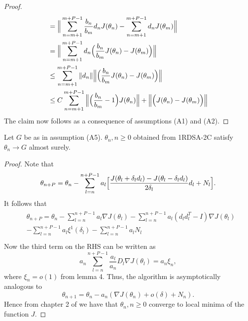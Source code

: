 \begin{proof}
\begin{align*}
  & =\Big{\|}\sum_{n=m+1}^{m+P-1}\frac{b_n}{b_m}d_n J(\theta_n)-\sum_{n=m+1}^{m+P-1}d_n J(\theta_{m})\Big{\|}\\
  & =\Big{\|}\sum_{n=m+1}^{m+P-1}d_n\Big{(}\frac{b_n}{b_m}J(\theta_n)-J(\theta_{m})\Big{)}\Big{\|}\\
  & \leq \sum_{n=m+1}^{m+P-1}\|d_n\|\Big{\|}\Big{(}\frac{b_n}{b_m}J(\theta_n)-J(\theta_{m})\Big{)}\Big{\|}\\
  &\leq C \sum_{n=m+1}^{m+P-1}\Big{\|}\Big{(}\frac{b_n}{b_m}-1\Big{)} J(\theta_n)\Big{\|}
  +\Big{\|}\Big{(} J(\theta_n)- J(\theta_{m})\Big{)}\Big{\|}
\end{align*}
The claim now follows as a consequence of assumptions (A1) and (A2).
\end{proof}
\begin{theorem}
 Let $G$ be as in assumption (A5). $\theta_n, n\geq0$ obtained from 1RDSA-2C satisfy $\theta_n \rightarrow G$
 almost surely.
\end{theorem}
\begin{proof}
 Note that
 \begin{equation*}
  \theta_{n+P} = \theta_n-\sum\limits_{l=n}^{n+P-1}a_l\Big{[}\frac{J(\theta_l+\delta_l d_l)-J(\theta_l-\delta_l d_l)}{2\delta_l}d_l+N_{l}\Big{]}.
 \end{equation*}
It follows that
 \begin{align*}
  \begin{split}
  & \theta_{n+P} = \theta_n-\sum_{l=n}^{n+P-1}a_l\nabla J(\theta_l) 
   -\sum_{l=n}^{n+P-1}a_l(d_ld_l^T-I)\nabla J(\theta_l)\\
  & -\sum_{l=n}^{n+P-1}a_l \xi^{1}(\delta_l)-\sum_{l=n}^{n+P-1}a_lN_{l}\\
  \end{split}
 \end{align*}
Now the third term on the RHS can be written as
$$a_n\sum_{l=n}^{n+P-1}\frac{a_l}{a_n}D_{l}\nabla J(\theta_l)=a_n\xi_{n},$$
where $\xi_{n}=o(1)$ from lemma 4.
Thus, the algorithm is asymptotically analogous to
$$\theta_{n+1}=\theta_n-a_n(\nabla J(\theta_n)+o(\delta)+N_{n}).$$
Hence from chapter 2 of \cite{borkar2008stochastic} we have that $\theta_n, n\geq0$ converge to
local minima of the function $J.$
\end{proof}
